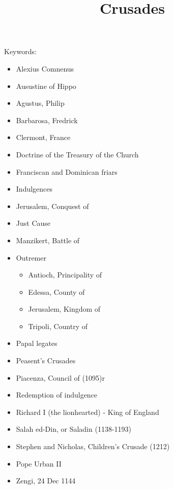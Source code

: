 \documentclass{article}
\begin{document}
\title{Crusades}
\maketitle
Keywords:
\begin{itemize}
	\item Alexius Comnenus
	\item Ausustine of Hippo
	\item Agustus, Philip
	\item Barbarosa, Fredrick
	\item Clermont, France
	\item Doctrine of the Treasury of the Church
	\item Franciscan and Dominican friars
	\item Indulgences
	\item Jerusalem, Conquest of
	\item Just Cause
	\item Manzikert, Battle of
	\item Outremer
	\begin{itemize}
		\item Antioch, Principality of
		\item Edessa, County of
		\item Jerusalem, Kingdom of
		\item Tripoli, Country of
	\end{itemize}
	\item Papal legates
	\item Peasent's Crusades
	\item Piacenza, Council of (1095)r
	\item Redemption of indulgence
	\item Richard I (the lionhearted) - King of England
	\item Salah ed-Din, or Saladin (1138-1193)
	\item Stephen and Nicholas, Children's Crusade (1212)
	\item Pope Urban II
	\item Zengi, 24 Dec 1144
\end{itemize}
\end{document}
